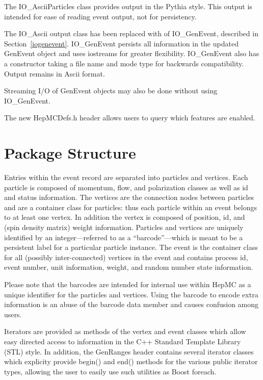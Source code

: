 \documentclass[11pt,letterpaper]{article}
\begin{document}
The IO\_AsciiParticles class provides output in the Pythia style.
This output is intended for ease of reading event output, not for persistency.

The IO\_Ascii output class has been replaced with of IO\_GenEvent, 
described in Section~\ref{iogenevent}.  
IO\_GenEvent persists all information in the updated GenEvent object and
uses iostreams for greater flexibility.  IO\_GenEvent also has a 
constructor taking a file name and mode type for backwards compatibility. 
Output remains in Ascii format.

Streaming I/O of GenEvent objects may also be done without using IO\_GenEvent.

The new HepMCDefs.h header allows users to query which features are 
enabled.

%
%

\section{Package Structure}

Entries within the event record are separated into particles and
vertices. Each particle is composed of momentum, flow, and
polarization classes as well as id and status information. 
The vertices are the connection nodes
between particles and are a container class for particles: thus each
particle within an event belongs to at least one vertex. In addition
the vertex is composed of position, id, and (spin density matrix) 
weight information. Particles and vertices are uniquely identified by
an integer---referred to as a ``barcode''---which is meant to be a
persistent label for a particular particle instance.
The event is the container class for all (possibly
inter-connected) vertices in the event and contains process id, event
number, unit information, weight, and random number state information.

Please note that the barcodes are intended for internal use within HepMC 
as a unique identifier for the particles and vertices.
Using the barcode to encode extra information is an abuse of 
the barcode data member and causes confusion among users. 

Iterators are provided as methods of the vertex and event classes
which allow easy directed access to information in the C++ Standard
Template Library (STL) style.   
In addition, the GenRanges header contains several iterator 
classes which explicity provide begin() and end() methods for the various
public iterator types, allowing the user to easily use such utilities as
Boost foreach.
\end{document}
